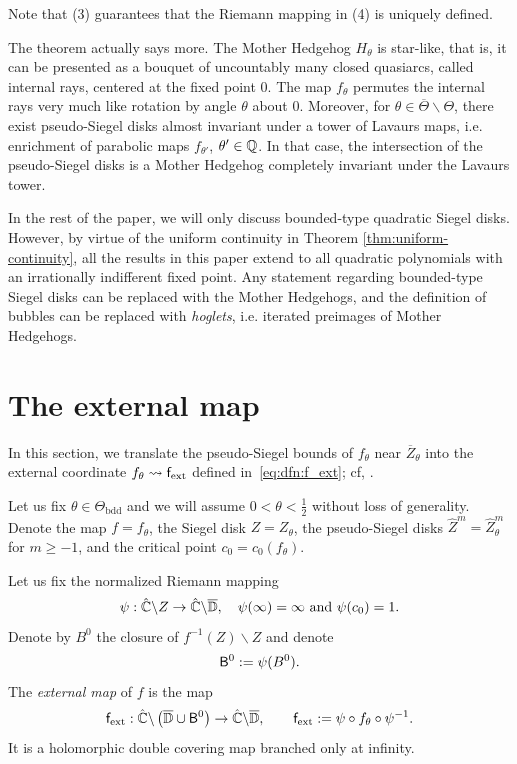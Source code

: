 \documentclass{amsart}
\begin{document}
Note that (3) guarantees that the Riemann mapping in (4) is uniquely defined.

\begin{remark}
    The theorem actually says more. The Mother Hedgehog $H_\theta$ is star-like, that is, it can be presented as a bouquet of uncountably many closed quasiarcs, called internal rays, centered at the fixed point $0$. The map $f_\theta$ permutes the internal rays very much like rotation by angle $\theta$ about $0$. Moreover, for $\theta \in \overline{\Theta}\backslash \Theta$, there exist pseudo-Siegel disks almost invariant under a tower of Lavaurs maps, i.e. enrichment of parabolic maps $f_{\theta'}$, $\theta' \in \mathbb{Q}$. In that case, the intersection of the pseudo-Siegel disks is a Mother Hedgehog completely invariant under the Lavaurs tower.
\end{remark}

In the rest of the paper, we will only discuss bounded-type quadratic Siegel disks. However, by virtue of the uniform continuity in Theorem \ref{thm:uniform-continuity}, all the results in this paper extend to all quadratic polynomials with an irrationally indifferent fixed point. Any statement regarding bounded-type Siegel disks can be replaced with the Mother Hedgehogs, and the definition of bubbles can be replaced with \emph{hoglets}, i.e. iterated preimages of Mother Hedgehogs. 

\section{The external map}
\label{sec:external}  
In this section, we translate the pseudo-Siegel bounds of $f_\theta$ near $\overline Z_\theta$ into the external coordinate $f_\theta\leadsto \mathsf{f}_{\textnormal{ext}}$ defined in~\eqref{eq:dfn:f_ext}; cf, \cite[{\S11.0.2 and Remark 11.8}]{DL22}.

Let us fix $\theta \in \Theta_{\text{bdd}}$ and we will assume $0 < \theta < \frac{1}{2}$ without loss of generality. 
Denote the map $f=f_\theta$, the Siegel disk $Z=Z_\theta$, the pseudo-Siegel disks $\hat{Z}^m = \hat{Z}^m_\theta$ for $m \geq -1$, and the critical point $c_0=c_0(f_\theta)$. 

Let us fix the normalized Riemann mapping 
\[
    \psi: \hat{\mathbb{C}} \backslash Z \to \hat{\mathbb{C}} \backslash \overline{\mathbb{D}}, \quad \psi(\infty)=\infty \text{ and } \psi(c_0) = 1.
\]
Denote by $B^0$ the closure of $f^{-1}(Z)\backslash Z$ and denote 
\[
\mathsf{B}^0 := \psi(B^0).
\]
The \emph{external map} of $f$ is the map
\begin{equation}
    \label{eq:dfn:f_ext}
    \mathsf{f}_{\textnormal{ext}} : \hat{\mathbb{C}} \backslash \left( \overline{\mathbb{D}} \cup \mathsf{B}^0 \right) \to \hat{\mathbb{C}} \backslash \overline{\mathbb{D}}, \qquad \mathsf{f}_{\textnormal{ext}}:= \psi \circ f_\theta \circ \psi^{-1}.
\end{equation}
It is a holomorphic double covering map branched only at infinity. 
\end{document}
